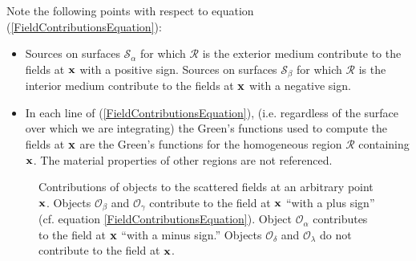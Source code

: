 Note the following points with respect to equation
(\ref{FieldContributionsEquation}):
\begin{itemize}
  \item Sources on surfaces $\mathcal{S}_\alpha$ for which
        $\mathcal{R}$ is the exterior medium  
        contribute to the fields at $\mathbf{x}$ 
        with a positive sign.
        Sources on surfaces $\mathcal{S}_\beta$ for which
        $\mathcal{R}$ is the interior medium  
        contribute to the fields at $\mathbf{x}$ 
        with a negative sign.

  \item In each line of (\ref{FieldContributionsEquation}), 
        (i.e. regardless of the surface over which we are 
        integrating) the Green's functions used to compute
        the fields at $\mathbf{x}$ are the Green's functions for
        the homogeneous region $\mathcal{R}$ containing $\mathbf{x}$.
        The material properties of other regions are not
        referenced.
\end{itemize}

\begin{figure}
\begin{center}
\caption{Contributions of objects to the scattered fields at 
         an arbitrary point $\mathbf{x}$. Objects $\mathcal{O}_\beta$
         and $\mathcal{O}_\gamma$ contribute
         to the field at $\mathbf{x}$ ``with a plus sign'' 
         (cf. equation \ref{FieldContributionsEquation}).
         Object $\mathcal{O}_\alpha$ 
         contributes to the field at $\mathbf{x}$ ``with a minus
         sign.'' Objects $\mathcal{O}_\delta$ and $\mathcal{O}_\lambda$
         do not contribute to the field at $\mathbf{x}$.}
\label{FieldContributionsFigure}
\end{center}
\end{figure}
